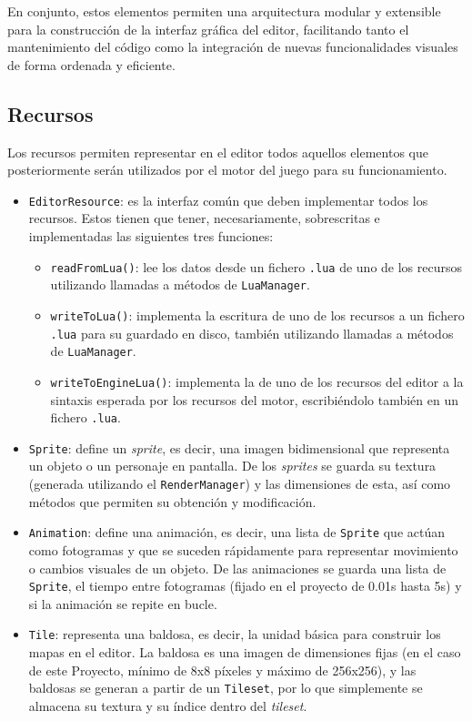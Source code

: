 En conjunto, estos elementos permiten una arquitectura modular y extensible para la construcción de la interfaz gráfica del editor, facilitando tanto el mantenimiento del código como la integración de nuevas funcionalidades visuales de forma ordenada y eficiente.

\subsection{Recursos}
Los recursos permiten representar en el editor todos aquellos elementos que posteriormente serán utilizados por el motor del juego para su funcionamiento.

\begin{itemize}
	\item \texttt{EditorResource}: es la interfaz común que deben implementar todos los recursos. Estos tienen que tener, necesariamente, sobrescritas e implementadas las siguientes tres funciones:
	\begin{itemize}
		\item \texttt{readFromLua()}: lee los datos desde un fichero \texttt{.lua} de uno de los recursos utilizando llamadas a métodos de \texttt{LuaManager}.
		\item \texttt{writeToLua()}: implementa la escritura de uno de los recursos a un fichero \texttt{.lua} para su guardado en disco, también utilizando llamadas a métodos de \texttt{LuaManager}.
		\item \texttt{writeToEngineLua()}: implementa la  de uno de los recursos del editor a la sintaxis esperada por los recursos del motor, escribiéndolo también en un fichero \texttt{.lua}.
	\end{itemize}
	\item \texttt{Sprite}: define un \textit{sprite}, es decir, una imagen bidimensional que representa un objeto o un personaje en pantalla. De los \textit{sprites} se guarda su textura (generada utilizando el \texttt{RenderManager}) y las dimensiones de esta, así como métodos que permiten su obtención y modificación.
	\item \texttt{Animation}: define una animación, es decir, una lista de \texttt{Sprite} que actúan como fotogramas y que se suceden rápidamente para representar movimiento o cambios visuales de un objeto. De las animaciones se guarda una lista de \texttt{Sprite}, el tiempo entre fotogramas (fijado en el proyecto de 0.01s hasta 5s) y si la animación se repite en bucle. 
	\item \texttt{Tile}: representa una baldosa, es decir, la unidad básica para construir los mapas en el editor. La baldosa es una imagen de dimensiones fijas (en el caso de este Proyecto, mínimo de 8x8 píxeles y máximo de 256x256), y las baldosas se generan a partir de un \texttt{Tileset}, por lo que simplemente se almacena su textura y su índice dentro del \textit{tileset}.

\end{itemize}
